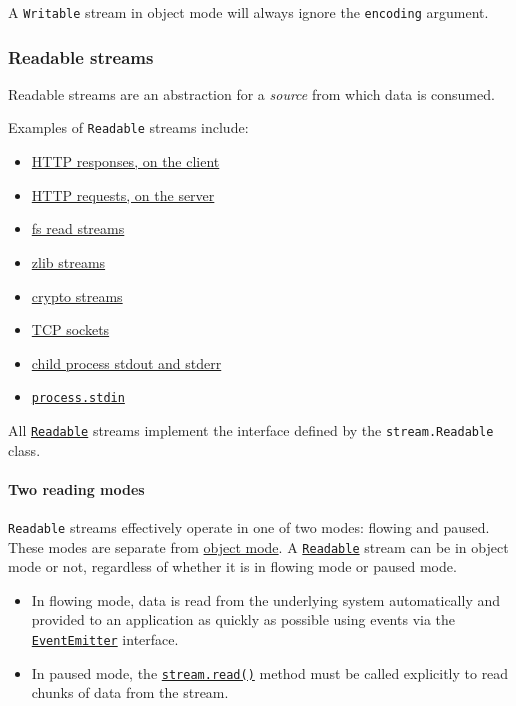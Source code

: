 A \texttt{Writable} stream in object mode will always ignore the
\texttt{encoding} argument.

\subsubsection{Readable streams}\label{readable-streams}

Readable streams are an abstraction for a \emph{source} from which data
is consumed.

Examples of \texttt{Readable} streams include:

\begin{itemize}
\tightlist
\item
  \href{http.md\#class-httpincomingmessage}{HTTP responses, on the
  client}
\item
  \href{http.md\#class-httpincomingmessage}{HTTP requests, on the
  server}
\item
  \href{fs.md\#class-fsreadstream}{fs read streams}
\item
  \href{zlib.md}{zlib streams}
\item
  \href{crypto.md}{crypto streams}
\item
  \href{net.md\#class-netsocket}{TCP sockets}
\item
  \href{child_process.md\#subprocessstdout}{child process stdout and
  stderr}
\item
  \href{process.md\#processstdin}{\texttt{process.stdin}}
\end{itemize}

All \hyperref[class-streamreadable]{\texttt{Readable}} streams implement
the interface defined by the \texttt{stream.Readable} class.

\paragraph{Two reading modes}\label{two-reading-modes}

\texttt{Readable} streams effectively operate in one of two modes:
flowing and paused. These modes are separate from
\hyperref[object-mode]{object mode}. A
\hyperref[class-streamreadable]{\texttt{Readable}} stream can be in
object mode or not, regardless of whether it is in flowing mode or
paused mode.

\begin{itemize}
\item
  In flowing mode, data is read from the underlying system automatically
  and provided to an application as quickly as possible using events via
  the \href{events.md\#class-eventemitter}{\texttt{EventEmitter}}
  interface.
\item
  In paused mode, the
  \hyperref[readablereadsize]{\texttt{stream.read()}} method must be
  called explicitly to read chunks of data from the stream.
\end{itemize}

